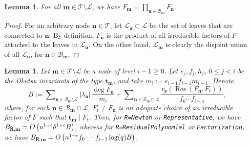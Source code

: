 \documentclass{amsart}
\newtheorem{lemma}[theorem]{Lemma}
\begin{document}
\begin{lemma}\label{branches}
For all ${\mathbf{m}}\in{\mathcal{T}}\setminus{\mathcal{L}}$, we have 
$F_{\mathbf{m}}=\prod\nolimits_{{\mathbf{n}}\in{{\mathcal B}}_{\mathbf{m}}}F_{\mathbf{n}}$.
\end{lemma}

\begin{proof}
For an arbitrary node ${\mathbf{n}}\in{\mathcal{T}}$, let ${\mathcal{L}}_{\mathbf{n}}\subset{\mathcal{L}}$ be the set of leaves that are connected to ${\mathbf{n}}$. By definition, $F_{\mathbf{n}}$ is the product of all irreducible factors of $F$ attached to the leaves in ${\mathcal{L}}_{\mathbf{n}}$. On the other hand, ${\mathcal{L}}_{\mathbf{m}}$ is clearly the disjoint union of all ${\mathcal{L}}_{\mathbf{n}}$, for ${\mathbf{n}}\in{{\mathcal B}}_{\mathbf{m}}$. 
\end{proof}

\begin{lemma}\label{BR}
Let ${\mathbf{m}}\in{\mathcal{T}}\setminus{\mathcal{L}}$ be a node of level $i-1\ge0$. Let $e_j,f_j,h_j$, $0\le j<i$ be the Okutsu invariants of the type ${\mathbf{t}}_{\mathbf{m}}$, and take $m_i:=e_{i-1}f_{i-1}m_{i-1}$. Denote
$$
B:=\sum\nolimits_{{\mathbf{n}}\in{{\mathcal B}}_{\mathbf{m}}\setminus{\mathcal{L}}}|\lambda_{\mathbf{n}}|\,\dfrac{\deg F_{\mathbf{n}}}{m_i}+\sum\nolimits_{{\mathbf{n}}\in{{\mathcal B}}_{\mathbf{m}}\cap{\mathcal{L}}}\dfrac{v_{\mathfrak{p}}({\operatorname{Res}}(F_{\mathbf{n}},F_t))}{f_0\cdots f_{i-1}},
$$
where, for each ${\mathbf{n}}\in{{\mathcal B}}_{\mathbf{m}}\cap{\mathcal{L}}$, $F_t\ne F_{\mathbf{n}}$ is an adequate choice of an irreducible factor of $F$ such that ${\mathbf{t}}_{\mathbf{m}}\mid F_t$.
Then, for {\tt R=Newton} or {\tt Representative}, we have $B_{\mbox{\tt R},{\mathbf{m}}}=O\left(n^{1+\epsilon}\delta^{1+\epsilon}B\right)$, whereas for {\tt R=ResidualPo\-lynomial} or {\tt Factorization}, we have
$B_{\mbox{\tt R},{\mathbf{m}}}=O\left(n^{1+\epsilon}
f_0\cdots f_{i-1}\log(q)B\right)$.
\end{lemma}
\end{document}
